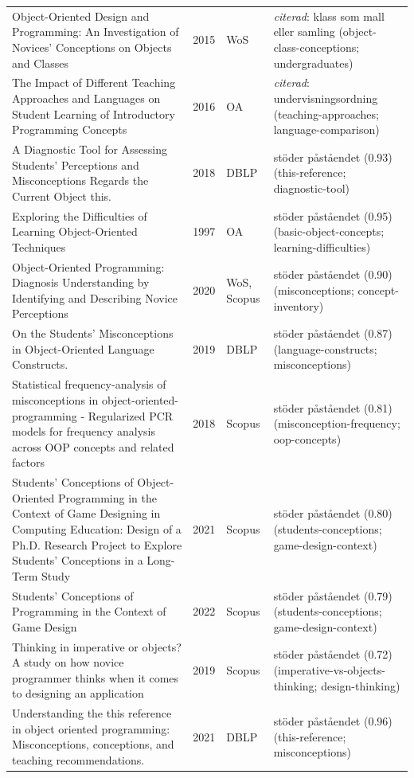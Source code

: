 \begin{longtable}{@{}%
  >{\raggedright\arraybackslash}p{}c%
  >{\raggedright\arraybackslash}p{}%
  >{\raggedright\arraybackslash}p{}@{}}
Object-Oriented Design and Programming: An Investigation of Novices' Conceptions on Objects and Classes & 2015 & WoS & \emph{citerad}: klass som mall eller samling (object-class-conceptions; undergraduates) \\
The Impact of Different Teaching Approaches and Languages on Student Learning of Introductory Programming Concepts & 2016 & OA & \emph{citerad}: undervisningsordning (teaching-approaches; language-comparison) \\
A Diagnostic Tool for Assessing Students' Perceptions and Misconceptions Regards the Current Object \textquotedbl{}this\textquotedbl{}. & 2018 & DBLP & stöder påståendet (0.93) (this-reference; diagnostic-tool) \\
Exploring the Difficulties of Learning Object-Oriented Techniques & 1997 & OA & stöder påståendet (0.95) (basic-object-concepts; learning-difficulties) \\
Object-Oriented Programming: Diagnosis Understanding by Identifying and Describing Novice Perceptions & 2020 & WoS, Scopus & stöder påståendet (0.90) (misconceptions; concept-inventory) \\
On the Students' Misconceptions in Object-Oriented Language Constructs. & 2019 & DBLP & stöder påståendet (0.87) (language-constructs; misconceptions) \\
Statistical frequency-analysis of misconceptions in object-oriented-programming - Regularized PCR models for frequency analysis across OOP concepts and related factors & 2018 & Scopus & stöder påståendet (0.81) (misconception-frequency; oop-concepts) \\
Students' Conceptions of Object-Oriented Programming in the Context of Game Designing in Computing Education: Design of a Ph.D. Research Project to Explore Students' Conceptions in a Long-Term Study & 2021 & Scopus & stöder påståendet (0.80) (students-conceptions; game-design-context) \\
Students' Conceptions of Programming in the Context of Game Design & 2022 & Scopus & stöder påståendet (0.79) (students-conceptions; game-design-context) \\
Thinking in imperative or objects? A study on how novice programmer thinks when it comes to designing an application & 2019 & Scopus & stöder påståendet (0.72) (imperative-vs-objects-thinking; design-thinking) \\
Understanding the \textquotedbl{}this\textquotedbl{} reference in object oriented programming: Misconceptions, conceptions, and teaching recommendations. & 2021 & DBLP & stöder påståendet (0.96) (this-reference; misconceptions) \\

\end{longtable}
